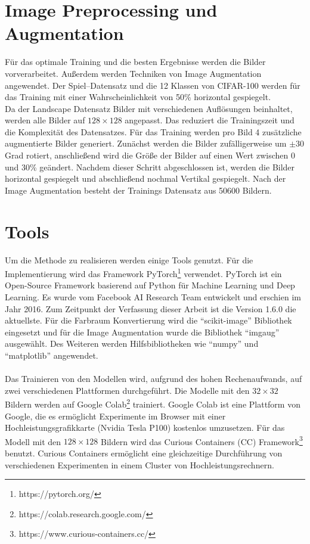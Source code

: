 \section{Image Preprocessing und Augmentation}
Für das optimale Training und die besten Ergebnisse werden die Bilder vorverarbeitet. Außerdem werden Techniken von Image Augmentation angewendet.
Der Spiel–Datensatz und die 12 Klassen von CIFAR-100 werden für das Training mit einer Wahrscheinlichkeit von 50\% horizontal gespiegelt.
\\
Da der Landscape Datensatz Bilder mit verschiedenen Auflösungen beinhaltet, werden alle Bilder auf $ 128 \times 128 $ angepasst. Das
reduziert die Trainingszeit und die Komplexität des Datensatzes.
Für das Training werden pro Bild 4 zusätzliche augmentierte Bilder generiert. Zunächst werden die Bilder zufälligerweise um $\pm 30$ Grad rotiert,
anschließend wird die Größe der Bilder auf einen Wert zwischen 0 und 30\% geändert.
Nachdem dieser Schritt abgeschlossen ist, werden die Bilder horizontal gespiegelt und abschließend nochmal Vertikal gespiegelt.
Nach der Image Augmentation besteht der Trainings Datensatz aus 50600 Bildern.

\section{Tools}
Um die Methode zu realisieren werden einige Tools genutzt. Für die Implementierung wird das Framework
PyTorch\footnote{https://pytorch.org/}\label{tool:pytorch} verwendet. PyTorch ist ein Open-Source Framework basierend auf Python für Machine Learning und
Deep Learning. Es wurde vom Facebook AI Research Team entwickelt und erschien im Jahr 2016. Zum Zeitpunkt der Verfassung dieser Arbeit ist
die Version 1.6.0 die aktuellste. Für die Farbraum Konvertierung wird die ``scikit-image'' Bibliothek eingesetzt und für die Image Augmentation
wurde die Bibliothek ``imgaug'' ausgewählt. Des Weiteren werden Hilfsbibliotheken wie ``numpy'' und ``matplotlib'' angewendet.
\\
\\
Das Trainieren von den Modellen wird, aufgrund des hohen Rechenaufwands, auf zwei verschiedenen Plattformen durchgeführt. Die Modelle mit den
$32 \times 32$ Bildern werden auf Google Colab\footnote{https://colab.research.google.com/} trainiert. Google Colab ist eine Plattform von
Google, die es ermöglicht Experimente im Browser mit einer Hochleistungsgrafikkarte (Nvidia Tesla P100) kostenlos umzusetzen. Für das Modell mit den
$128 \times 128$ Bildern
wird das Curious Containers (CC) Framework\footnote{https://www.curious-containers.cc/} benutzt. Curious Containers ermöglicht eine
gleichzeitige Durchführung von verschiedenen Experimenten in einem Cluster von Hochleistungsrechnern.


